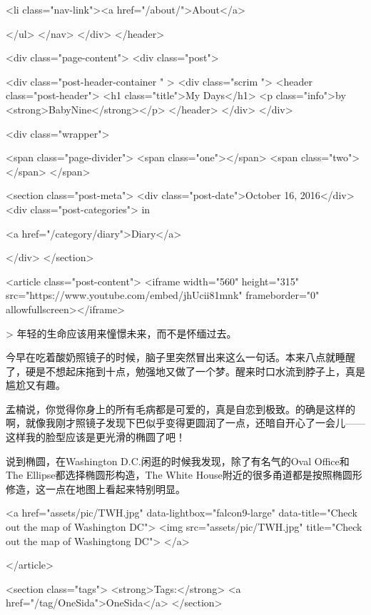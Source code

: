         
          
          <li class="nav-link"><a href="/about/">About</a>
          
        
          
        
          
        
          
        
      </ul>
    </nav>
  </div>
</header>


    <div class="page-content">
        <div class="post">

<div class="post-header-container " >
  <div class="scrim ">
    <header class="post-header">
      <h1 class="title">My Days</h1>
      <p class="info">by <strong>BabyNine</strong></p>
    </header>
  </div>
</div>

<div class="wrapper">

 <span class="page-divider">
  <span class="one"></span>
  <span class="two"></span>
</span>
 

<section class="post-meta">
  <div class="post-date">October 16, 2016</div>
  <div class="post-categories">
  in 
    
    <a href="/category/diary">Diary</a>
    
  
  </div>
</section>  

<article class="post-content">
  <iframe width="560" height="315" src="https://www.youtube.com/embed/jhUcii81mnk" frameborder="0" allowfullscreen></iframe>

> 年轻的生命应该用来憧憬未来，而不是怀缅过去。

今早在吃着酸奶照镜子的时候，脑子里突然冒出来这么一句话。本来八点就睡醒了，硬是不想起床拖到十点，勉强地又做了一个梦。醒来时口水流到脖子上，真是尴尬又有趣。

孟楠说，你觉得你身上的所有毛病都是可爱的，真是自恋到极致。的确是这样的啊，就像我刚才照镜子发现下巴似乎变得更圆润了一点，还暗自开心了一会儿——这样我的脸型应该是更光滑的椭圆了吧！

说到椭圆，在Washington D.C.闲逛的时候我发现，除了有名气的Oval Office和The Ellipse都选择椭圆形构造，The White House附近的很多甬道都是按照椭圆形修造，这一点在地图上看起来特别明显。

<a href="assets/pic/TWH.jpg" data-lightbox="falcon9-large" data-title="Check out the map of Washington DC">
<img src="assets/pic/TWH.jpg" title="Check out the map of Washingtong DC">
</a>


</article>



<section class="tags">
  <strong>Tags:</strong> <a href="/tag/OneSida">OneSida</a>
</section>



